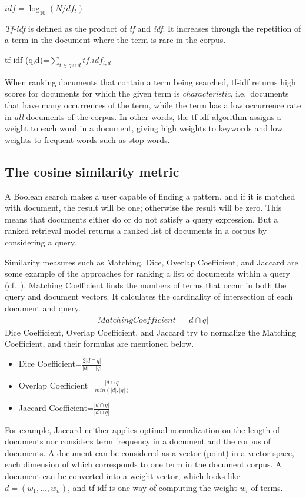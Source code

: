 \documentclass{IOS-Book-Article}
\begin{document}
\begin{center} 
	$idf=\log_{10} (N/df_t)$
\end{center}

\emph{Tf-idf} is defined as the product of \emph{tf} and \emph{idf}. 
It increases through the repetition of a term in the document where the term is rare in the corpus.

\begin{center}
	tf-idf (q,d)=$\sum_{t\in q\cap d} \mathit{tf}.idf_{t,d}$
\end{center}

When ranking documents that contain a term being searched, tf-idf returns high scores for documents for which the given term is \emph{characteristic}, i.e.\ documents that have many occurrences of the term, while the term has a low occurrence rate in \emph{all} documents of the corpus. In other words, the tf-idf algorithm assigns a weight to each word in a document, giving high weights to keywords and low weights to frequent words such as stop words.

\subsection{The cosine similarity metric}
\label{sec:cosine}
A Boolean search makes a user capable of finding a pattern, and if it is matched with document, the result will be one; otherwise the result will be zero. This means that documents either do or do not satisfy a query expression. But a ranked retrieval model returns a ranked list of documents in a corpus by considering a query. 

Similarity measures such as Matching, Dice, Overlap Coefficient, and Jaccard are some example of the approaches for ranking a list of documents within a query (cf.~\citet{ChristopherD1999}).
Matching Coefficient finds the numbers of terms that occur in both the query and document vectors. It calculates the cardinality of intersection of each document and query.
\begin{align*}
\mathit{Matching Coefficient}=|d\cap q|
\end{align*}
Dice Coefficient, Overlap Coefficient, and Jaccard try to normalize the Matching Coefficient, and their formulas are mentioned below.
\begin{itemize}
	\item Dice Coefficient=$\frac{2|d\cap q|}{|d|+|q|}$
	\item Overlap Coefficient=$\frac{|d\cap q|}{min(|d|,|q|)}$
	\item Jaccard Coefficient=$\frac{|d\cap q|}{|d\cup q|}$
\end{itemize}
For example, Jaccard neither applies optimal normalization on the length of documents nor considers term frequency in a document and the corpus of documents.
A document can be considered as a vector (point) in a vector space, each dimension of which corresponds to one term in the document corpus. 
A document can be converted into a weight vector, which looks like $d=(w_1,\dots,w_n)$, and tf-idf is one way of computing the weight $w_i$ of terms.
\end{document}

